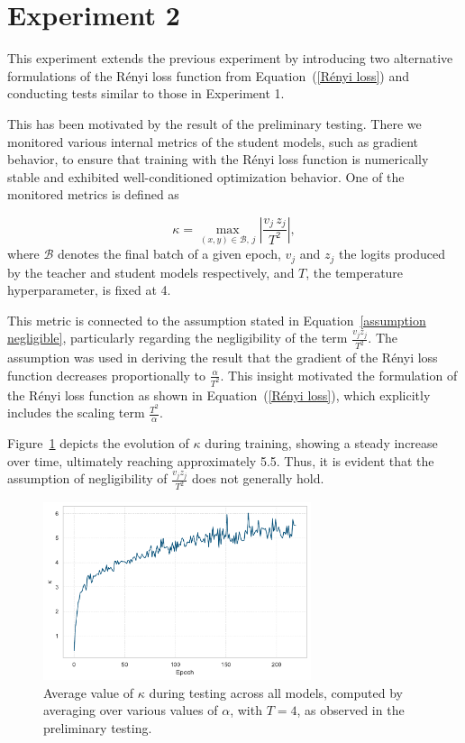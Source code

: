 \section{Experiment 2}

This experiment extends the previous experiment by introducing two alternative formulations of the Rényi loss function from Equation~(\ref{Rényi loss}) and conducting tests similar to those in Experiment 1.

This has been motivated by the result of the preliminary testing. There we monitored various internal metrics of the student models, such as gradient behavior, to ensure that training with the Rényi loss function is numerically stable and exhibited well-conditioned optimization behavior. One of the monitored metrics is defined as

\begin{equation*}
	\kappa = \max_{(x,y) \in \mathcal{B},\, j} \left| \frac{v_j\, z_j}{T^2} \right|,
\end{equation*}
where $\mathcal{B}$ denotes the final batch of a given epoch, $v_j$ and $z_j$ the logits produced by the teacher and student models respectively, and $T$, the temperature hyperparameter, is fixed at 4.

This metric is connected to the assumption stated in Equation~\ref{assumption negligible}, particularly regarding the negligibility of the term $\frac{v_j z_j}{T^2}$. The assumption was used in deriving the result that the gradient of the Rényi loss function decreases proportionally to $\frac{\alpha}{T^2}$. This insight motivated the formulation of the Rényi loss function as shown in Equation~(\ref{Rényi loss}), which explicitly includes the scaling term $\frac{T^2}{\alpha}$.

Figure~\ref{fig:xy_T2} depicts the evolution of $\kappa$ during training, showing a steady increase over time, ultimately reaching approximately 5.5. Thus, it is evident that the assumption of negligibility of $\frac{v_j z_j}{T^2}$ does not generally hold.

\begin{figure}[h!]
	\centering
	\includegraphics[width=0.7\textwidth]{../img/xy_T2.pdf}
	\caption{Average value of $\kappa$ during testing across all models, computed by averaging over various values of $\alpha$, with $T=4$, as observed in the preliminary testing.}
	\label{fig:xy_T2}
\end{figure}

